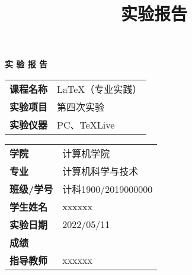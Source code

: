 \documentclass{article}
\title{实验报告}
\begin{document}
	\begin{titlepage}
		\centering

		{\Huge \fangsong
		 \textbf{实 \quad 验 \quad 报 \quad 告}}
		
		\vspace{0.10\textheight}   

		\begin{tabular}{c>{\centering\arraybackslash}b{8cm}}
			\rule{0pt}{20pt} 
			\fangsong \Large \textbf{课程名称} & 
			\fangsong \Large \LaTeX（专业实践）  \\ \cline{2-2} 
			\rule{0pt}{20pt} 
			\fangsong \Large \textbf{实验项目} &
			\fangsong \Large 第四次实验  \\ \cline{2-2} 
			\rule{0pt}{20pt} 
			\fangsong \Large \textbf{实验仪器} &
			\fangsong \Large  PC、TeXLive  \\ \cline{2-2} 
		\end{tabular}
		
		\vspace{0.40\textheight}   
		
	\begin{tabular}{>{\centering\arraybackslash}b{4cm}>{\centering\arraybackslash}b{8cm}}
		\rule{0pt}{20pt} 
		\fangsong \Large\textbf{学院} & 
		\fangsong \Large 计算机学院    \\ \cline{2-2} 
		\rule{0pt}{20pt} 
		\fangsong \Large\textbf{专业} & 
		\fangsong \Large 计算机科学与技术  \\ \cline{2-2} 
		\rule{0pt}{20pt} 
		\fangsong \Large \textbf{班级/学号} & 
		\fangsong \Large  计科1900/2019000000  \\ \cline{2-2} 
		\rule{0pt}{20pt} 
		\fangsong \Large \textbf{学生姓名} & 
		\fangsong \Large xxxxxx  \\ \cline{2-2} 
		\rule{0pt}{20pt} 
		\fangsong \Large\textbf{实验日期} & 
		\fangsong \LARGE 2022/05/11  \\ \cline{2-2} 
		\rule{0pt}{20pt} 
		\fangsong \Large \textbf{成绩} &
		\fangsong \Large   \\ \cline{2-2} 
		\rule{0pt}{20pt} 
		\fangsong \Large\textbf{指导教师} & 
		\fangsong \LARGE xxxxxx  \\ \cline{2-2} 
	\end{tabular}

	\end{titlepage}
\end{document}
